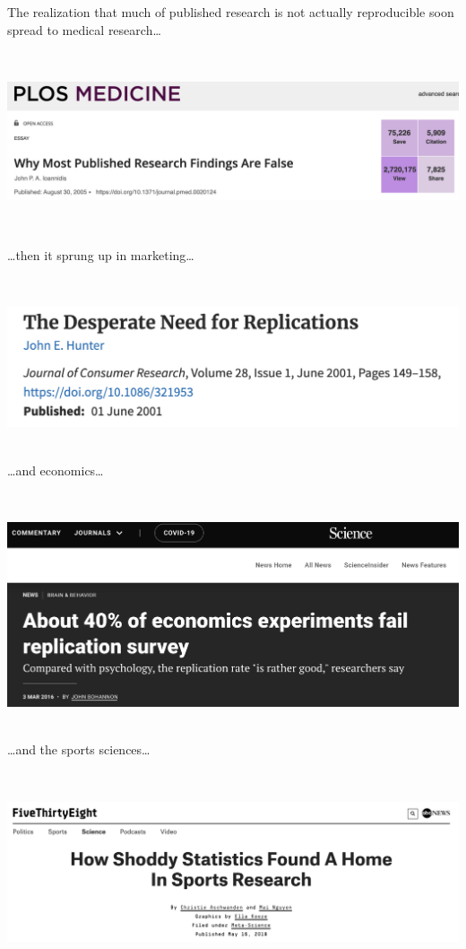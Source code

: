 \documentclass[]{book}
\begin{document}
The realization that much of published research is not actually reproducible soon spread to medical research\ldots{}

~

\includegraphics{img/reproducibility-psych.png}

~

\ldots{}then it sprung up in marketing\ldots{}

~

\includegraphics{img/reproducibility-marketing.png}
~

\ldots{}and economics\ldots{}

~

\includegraphics{img/reproducibility-econ.png}
~

\ldots{}and the sports sciences\ldots{}

~

\includegraphics{img/reproducibility-sports.png}
~
\end{document}
